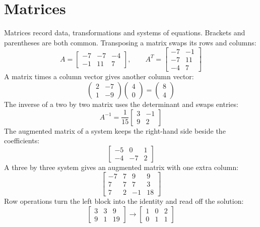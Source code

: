 \documentclass[11pt]{article}
\begin{document}
\section*{Matrices}
Matrices record data, transformations and systems of equations. Brackets and parentheses are both common.
Transposing a matrix swaps its rows and columns:
\label{eq013}\[
  A = \begin{bmatrix} -7 & -7 & -4 \\ -1 & 11 & 7 \end{bmatrix}, \qquad A^{T} = \begin{bmatrix} -7 & -1 \\ -7 & 11 \\ -4 & 7 \end{bmatrix}
\]
A matrix times a column vector gives another column vector:
\label{eq014}\[
  \begin{pmatrix} 2 & -7 \\ 1 & -9 \end{pmatrix}\begin{pmatrix} 4 \\ 0 \end{pmatrix} = \begin{pmatrix} 8 \\ 4 \end{pmatrix}
\]
The inverse of a two by two matrix uses the determinant and swaps entries:
\label{eq015}\[
  A^{-1} = \frac{1}{15} \begin{bmatrix} 3 & -1 \\ 9 & 2 \end{bmatrix}
\]
The augmented matrix of a system keeps the right-hand side beside the coefficients:
\label{eq016}\[
  \left[ \begin{array}{cc|c} -5 & 0 & 1 \\ -4 & -7 & 2 \end{array} \right]
\]
A three by three system gives an augmented matrix with one extra column:
\label{eq017}\[
  \left[ \begin{array}{ccc|c} -7 & 7 & 9 & 9 \\ 7 & 7 & 7 & 3 \\ 7 & 2 & -1 & 18 \end{array} \right]
\]
Row operations turn the left block into the identity and read off the solution:
\label{eq018}\[
  \left[ \begin{array}{cc|c} 3 & 3 & 9 \\ 9 & 1 & 19 \end{array} \right] \longrightarrow \left[ \begin{array}{cc|c} 1 & 0 & 2 \\ 0 & 1 & 1 \end{array} \right]
\]
\end{document}
